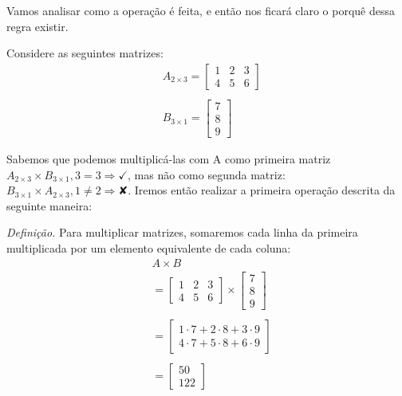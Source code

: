 \documentclass[
  portuguese,
  letterpaper,
  DIV=11,
  numbers=noendperiod]{scrreport}
\begin{document}
Vamos analisar como a operação é feita, e então nos ficará claro o
porquê dessa regra existir.

Considere as seguintes matrizes: \[
\begin{aligned}
    &A_{2\times 3} =
    \begin{bmatrix}
        1 & 2 & 3 \\
        4 & 5 & 6
    \end{bmatrix} \\ \\
    &B_{3\times 1} = 
    \begin{bmatrix}
        7 \\
        8 \\
        9
    \end{bmatrix}
\end{aligned}
\]

Sabemos que podemos multiplicá-las com A como primeira matriz
\(A_{2\times 3}\times B_{3\times 1}, 3=3\Rightarrow \checkmark\), mas
não como segunda matriz:
\(B_{3\times 1} \times A_{2\times 3}, 1\neq 2 \Rightarrow ✘\). Iremos
então realizar a primeira operação descrita da seguinte maneira:

\emph{Definição.} Para multiplicar matrizes, somaremos cada linha da
primeira multiplicada por um elemento equivalente de cada coluna: \[
\begin{aligned}
    &A \times B \\
    &=
    \begin{bmatrix}
        1 & 2 & 3 \\
        4 & 5 & 6
    \end{bmatrix}
    \times 
    \begin{bmatrix}
        7 \\
        8 \\
        9
    \end{bmatrix}\\ \\
    &=
    \begin{bmatrix}
        1 \cdot 7 + 2 \cdot 8 + 3 \cdot 9 \\
        4 \cdot 7 + 5 \cdot 8 + 6 \cdot 9
    \end{bmatrix} \\ \\
    &=
    \begin{bmatrix}
        50 \\
        122
    \end{bmatrix}
\end{aligned}
\]
\end{document}
